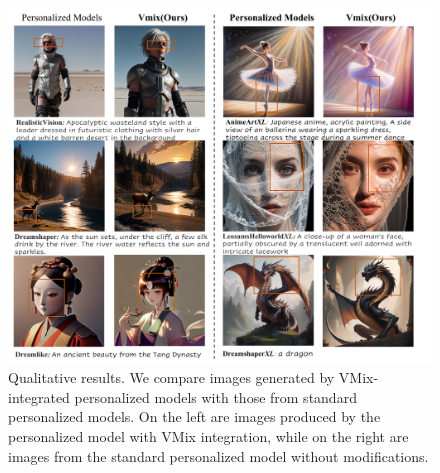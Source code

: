 \begin{figure}
    \centering
    \includegraphics[width=0.88\linewidth]{personal_model_compare.pdf}
    \caption{Qualitative results. We compare images generated by VMix-integrated personalized models with those from standard personalized models. On the left are images produced by the personalized model with VMix integration, while on the right are images from the standard personalized model without modifications.}
    \label{fig6}
\end{figure}

